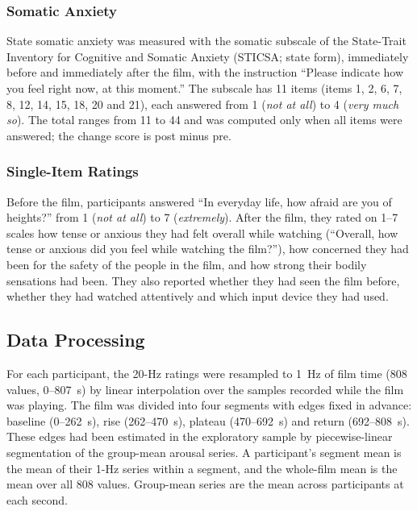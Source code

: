 \documentclass[man,floatsintext,12pt,donotrepeattitle]{apa7}
\begin{document}
\subsubsection{Somatic Anxiety}

State somatic anxiety was measured with the somatic subscale of the State-Trait Inventory for Cognitive and Somatic
Anxiety (STICSA; state form), immediately before and immediately after the film, with the instruction
\enquote{Please indicate how you feel right now, at this moment.} The subscale has 11 items (items 1, 2, 6, 7, 8, 12,
14, 15, 18, 20 and 21), each answered from 1 (\emph{not at all}) to 4 (\emph{very much so}). The total ranges from 11
to 44 and was computed only when all items were answered; the change score is post minus pre.

\subsubsection{Single-Item Ratings}

Before the film, participants answered \enquote{In everyday life, how afraid are you of heights?} from 1 (\emph{not
at all}) to 7 (\emph{extremely}). After the film, they rated on 1--7 scales how tense or anxious they had felt overall
while watching (\enquote{Overall, how tense or anxious did you feel while watching the film?}), how concerned they
had been for the safety of the people in the film, and how strong their bodily sensations had been. They also
reported whether they had seen the film before, whether they had watched attentively and which input device they had
used.

\subsection{Data Processing}

For each participant, the 20-Hz ratings were resampled to 1~Hz of film time (808 values, 0--807~s) by linear
interpolation over the samples recorded while the film was playing. The film was divided into four segments with
edges fixed in advance: baseline (0--262~s), rise (262--470~s), plateau (470--692~s) and return (692--808~s). These
edges had been estimated in the exploratory sample by piecewise-linear segmentation of the group-mean arousal series.
A participant's segment mean is the mean of their 1-Hz series within a segment, and the whole-film mean is the mean
over all 808 values. Group-mean series are the mean across participants at each second.
\end{document}

